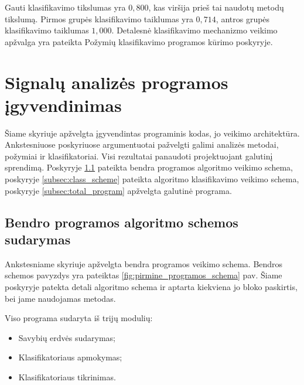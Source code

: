 \documentclass[]{vgtuef}
\begin{document}
Gauti klasifikavimo tikslumas yra $0,800$, kas viršija prieš tai naudotų metodų tikslumą. Pirmos grupės klasifikavimo taiklumas yra $0,714$, antros grupės klasifikavimo taiklumas $1,000$. Detalesnė klasifikavimo mechanizmo veikimo apžvalga yra pateikta Požymių klasifikavimo programos kūrimo poskyryje.

\section{Signalų analizės programos įgyvendinimas}

Šiame skyriuje apžvelgta įgyvendintas programinis kodas, jo veikimo architektūra. Ankstesniuose poskyriuose argumentuotai pažvelgti galimi analizės metodai, požymiai ir klasifikatoriai. Visi rezultatai panaudoti projektuojant galutinį sprendimą. Poskyryje \ref{subsec:total_scheme} pateikta bendra programos algoritmo veikimo schema, poskyryje \ref{subsec:class_scheme} pateikta algoritmo klasifikavimo veikimo schema, poskyryje \ref{subsec:total_program} apžvelgta galutinė programa.

\subsection{Bendro programos algoritmo schemos sudarymas}
\label{subsec:total_scheme}

Ankstesniame skyriuje apžvelgta bendra programos veikimo schema. Bendros schemos pavyzdys yra pateiktas \ref{fig:pirmine_programos_schema} pav. Šiame poskyryje patekta detali algoritmo schema ir aptarta kiekviena jo bloko paskirtis, bei jame naudojamas metodas.

Viso programa sudaryta iš trijų modulių:

\begin{itemize}
\item Savybių erdvės sudarymas;
\item Klasifikatoriaus apmokymas;
\item Klasifikatoriaus tikrinimas.
\end{itemize}
\end{document}

